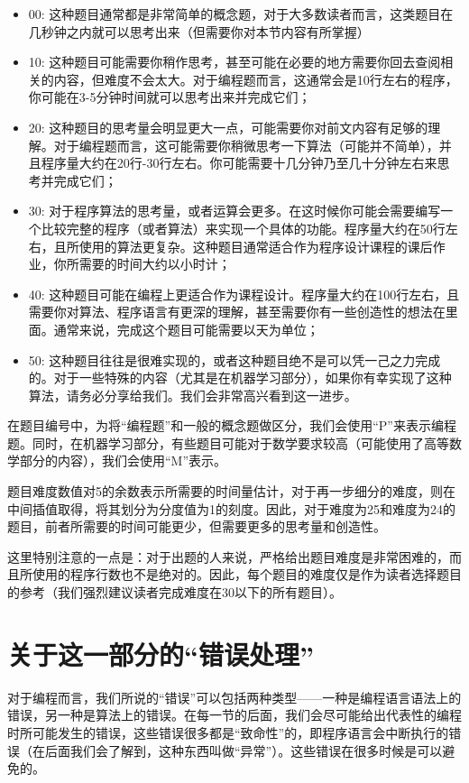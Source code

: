 \begin{itemize}
    \item 00: 这种题目通常都是非常简单的概念题，对于大多数读者而言，这类题目在几秒钟之内就可以思考出来（但需要你对本节内容有所掌握）
    \item 10: 这种题目可能需要你稍作思考，甚至可能在必要的地方需要你回去查阅相关的内容，但难度不会太大。对于编程题而言，这通常会是10行左右的程序，你可能在3-5分钟时间就可以思考出来并完成它们；
    \item 20: 这种题目的思考量会明显更大一点，可能需要你对前文内容有足够的理解。对于编程题而言，这可能需要你稍微思考一下算法（可能并不简单），并且程序量大约在20行-30行左右。你可能需要十几分钟乃至几十分钟左右来思考并完成它们；
    \item 30: 对于程序算法的思考量，或者运算会更多。在这时候你可能会需要编写一个比较完整的程序（或者算法）来实现一个具体的功能。程序量大约在50行左右，且所使用的算法更复杂。这种题目通常适合作为程序设计课程的课后作业，你所需要的时间大约以小时计；
    \item 40: 这种题目可能在编程上更适合作为课程设计。程序量大约在100行左右，且需要你对算法、程序语言有更深的理解，甚至需要你有一些创造性的想法在里面。通常来说，完成这个题目可能需要以天为单位；
    \item 50: 这种题目往往是很难实现的，或者这种题目绝不是可以凭一己之力完成的。对于一些特殊的内容（尤其是在机器学习部分），如果你有幸实现了这种算法，请务必分享给我们。我们会非常高兴看到这一进步。
\end{itemize}

在题目编号中，为将“编程题”和一般的概念题做区分，我们会使用“P”来表示编程题。同时，在机器学习部分，有些题目可能对于数学要求较高（可能使用了高等数学部分的内容），我们会使用“M”表示。

题目难度数值对5的余数表示所需要的时间量估计，对于再一步细分的难度，则在中间插值取得，将其划分为分度值为1的刻度。因此，对于难度为25和难度为24的题目，前者所需要的时间可能更少，但需要更多的思考量和创造性。

这里特别注意的一点是：对于出题的人来说，严格给出题目难度是非常困难的，而且所使用的程序行数也不是绝对的。因此，每个题目的难度仅是作为读者选择题目的参考（我们强烈建议读者完成难度在30以下的所有题目）。

\section*{关于这一部分的“错误处理”}

对于编程而言，我们所说的“错误”可以包括两种类型——一种是编程语言语法上的错误，另一种是算法上的错误。在每一节的后面，我们会尽可能给出代表性的编程时所可能发生的错误，这些错误很多都是“致命性”的，即程序语言会中断执行的错误（在后面我们会了解到，这种东西叫做“异常”）。这些错误在很多时候是可以避免的。

